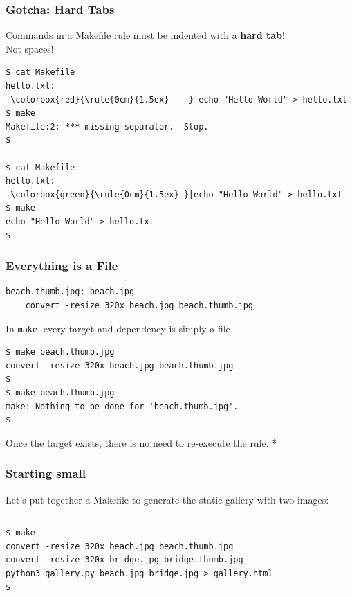 \documentclass[xcolor=dvipsnames,t,compress]{beamer}
\begin{document}
\begin{frame}[fragile]
\frametitle{Gotcha: Hard Tabs}
\vspace{-1em}
Commands in a Makefile rule must be indented with a \textbf{hard tab}! \\ Not spaces!

\begin{verbatim}
$ cat Makefile
hello.txt:
|\colorbox{red}{\rule{0cm}{1.5ex}    }|echo "Hello World" > hello.txt
$ make
Makefile:2: *** missing separator.  Stop.
$

$ cat Makefile
hello.txt:
|\colorbox{green}{\rule{0cm}{1.5ex}	}|echo "Hello World" > hello.txt
$ make
echo "Hello World" > hello.txt
$
\end{verbatim}
\end{frame}

\begin{frame}[fragile]
\frametitle{Everything is a File}
\vspace{-0.75em}
\begin{verbatim}
beach.thumb.jpg: beach.jpg
	convert -resize 320x beach.jpg beach.thumb.jpg
\end{verbatim}
In \texttt{make}, every target and dependency is simply a file.
\pause
\vspace{0.25em}
\begin{verbatim}
$ make beach.thumb.jpg
convert -resize 320x beach.jpg beach.thumb.jpg
$
$ make beach.thumb.jpg
make: Nothing to be done for 'beach.thumb.jpg'.
$
\end{verbatim}
Once the target exists, there is no need to re-execute the rule. *
\end{frame}


\begin{frame}[fragile]
\frametitle{Starting small}
Let's put together a Makefile to generate the static gallery with two images:
\inputminted[tabsize=4,frame=single]{make}{examples/make/Makefile.2}
\pause
\begin{verbatim}
$ make
convert -resize 320x beach.jpg beach.thumb.jpg
convert -resize 320x bridge.jpg bridge.thumb.jpg
python3 gallery.py beach.jpg bridge.jpg > gallery.html
$
\end{verbatim}
\end{frame}
\end{document}
